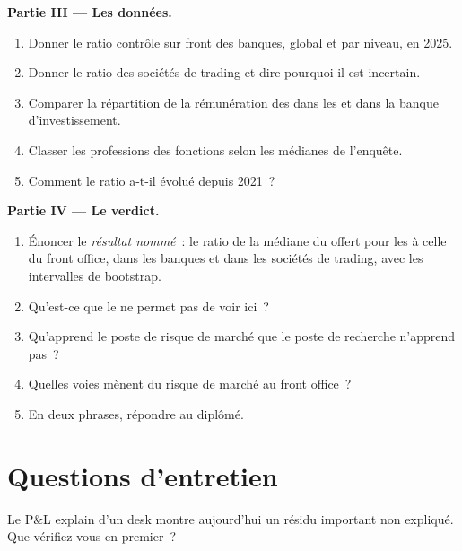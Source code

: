 \begin{problem}
\medskip\noindent\textbf{Partie III --- Les données.}
\begin{enumerate}[resume]
\item Donner le ratio contrôle sur front des banques, global et par niveau, en 2025.
\item Donner le ratio des sociétés de trading et dire pourquoi il est incertain.
\item Comparer la répartition de la rémunération des  dans les  et dans la banque d'investissement.
\item Classer les professions des fonctions selon les médianes de l'enquête.
\item Comment le ratio a-t-il évolué depuis 2021~?
\end{enumerate}

\medskip\noindent\textbf{Partie IV --- Le verdict.}
\begin{enumerate}[resume]
\item Énoncer le \emph{résultat nommé}~: le ratio de la médiane du  offert pour les  à celle du front office, dans les banques et
dans les sociétés de trading, avec les intervalles de bootstrap.
\item Qu'est-ce que le  ne permet pas de voir ici~?
\item Qu'apprend le poste de risque de marché que le poste de recherche n'apprend pas~?
\item Quelles voies mènent du risque de marché au front office~?
\item En deux phrases, répondre au diplômé.
\end{enumerate}
\end{problem}

\section{Questions d'entretien}

\begin{interviewq}\label{iq:in:risk-operations-product-control-and-compliance:1}
Le P\&L explain d'un desk montre aujourd'hui un résidu important non expliqué. Que vérifiez-vous en premier~?
\end{interviewq}

